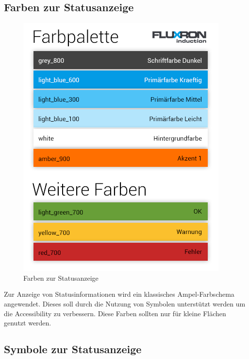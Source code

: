 \subsection{Farben zur Statusanzeige}
\label{subsec:Farben zur Statusanzeige}
\begin{figure}[H]
    \begin{center}
        \includegraphics[trim=0 0 0 370,clip,scale=0.7]{uiux/res/basic_colors}
    \end{center}
    \caption{Farben zur Statusanzeige}
\end{figure}
Zur Anzeige von Statusinformationen wird ein klassisches Ampel-Farbschema angewendet. Dieses soll durch die Nutzung von Symbolen unterstützt werden um die Accessibility zu verbessern. Diese Farben sollten nur für kleine Flächen genutzt werden.

\subsection{Symbole zur Statusanzeige}
\label{subsec:Symbole zur Statusanzeige}

